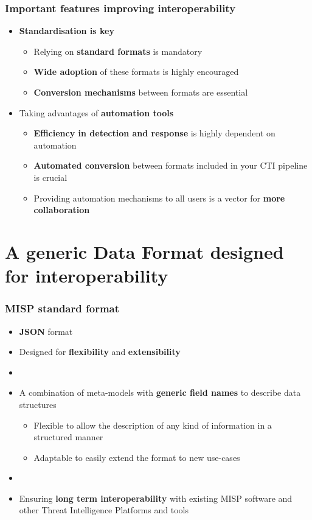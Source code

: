 \begin{frame}
    \frametitle{Important features improving interoperability}
    \begin{itemize}
        \item \textbf{Standardisation is key}
        \begin{itemize}
            \item Relying on \textbf{standard formats} is mandatory
            \item \textbf{Wide adoption} of these formats is highly encouraged
            \item \textbf{Conversion mechanisms} between formats are essential
        \end{itemize}
        \item Taking advantages of \textbf{automation tools}
        \begin{itemize}
            \item \textbf{Efficiency in detection and response} is highly dependent on automation
            \item \textbf{Automated conversion} between formats included in your CTI pipeline is crucial
            \item Providing automation mechanisms to all users is a vector for \textbf{more collaboration}
        \end{itemize}
    \end{itemize}
\end{frame}

\section{A generic Data Format designed for interoperability}

\begin{frame}
    \frametitle{MISP standard format}
    \begin{itemize}
        \item \textbf{JSON} format
        \item Designed for \textbf{flexibility} and \textbf{extensibility}
        \item []
        \item A combination of meta-models with \textbf{generic field names} to describe data structures
        \begin{itemize}
            \item Flexible to allow the description of any kind of information in a structured manner
            \item Adaptable to easily extend the format to new use-cases
        \end{itemize}
        \item []
        \item Ensuring \textbf{long term interoperability} with existing MISP software and other Threat Intelligence Platforms and tools
    \end{itemize}
\end{frame}

